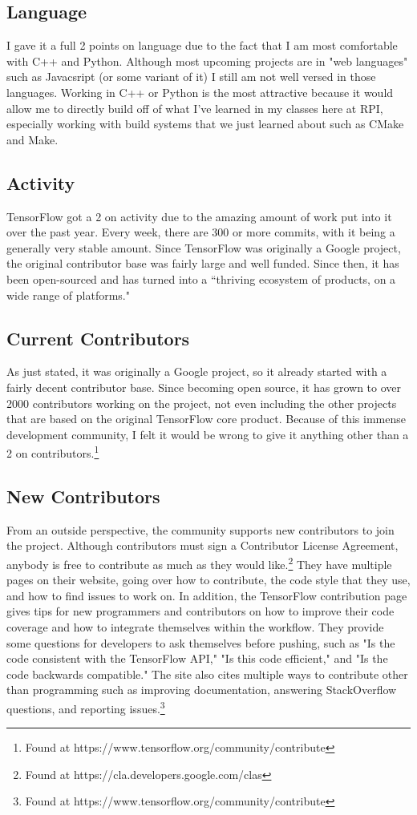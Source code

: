 \documentclass[12pt]{article}
\begin{document}
	\subsection{Language}
	I gave it a full 2 points on language due to the fact that I am most comfortable with C++ and Python. Although most upcoming projects are in "web languages" such as Javacsript (or some variant of it) I still am not well versed in those languages. Working in C++ or Python is the most attractive because it would allow me to directly build off of what I've learned in my classes here at RPI, especially working with build systems that we just learned about such as CMake and Make.
	
	\subsection{Activity}
	TensorFlow got a 2 on activity due to the amazing amount of work put into it over the past year. Every week, there are 300 or more commits, with it being a generally very stable amount. Since TensorFlow was originally a Google project, the original contributor base was fairly large and well funded. Since then, it has been open-sourced and has turned into a ``thriving ecosystem of products, on a wide range of platforms."
	
	\subsection{Current Contributors}
	As just stated, it was originally a Google project, so it already started with a fairly decent contributor base. Since becoming open source, it has grown to over 2000 contributors working on the project, not even including the other projects that are based on the original TensorFlow core product. Because of this immense development community, I felt it would be wrong to give it anything other than a 2 on contributors.\footnote{Found at https://www.tensorflow.org/community/contribute}
	
	\subsection{New Contributors}
	From an outside perspective, the community supports new contributors to join the project. Although contributors must sign a Contributor License Agreement, anybody is free to contribute as much as they would like.\footnote{Found at https://cla.developers.google.com/clas} They have multiple pages on their website, going over how to contribute, the code style that they use, and how to find issues to work on. In addition, the TensorFlow contribution page gives tips for new programmers and contributors on how to improve their code coverage and how to integrate themselves within the workflow. They provide some questions for developers to ask themselves before pushing, such as "Is the code consistent with the TensorFlow API," "Is this code efficient," and "Is the code backwards compatible." The site also cites multiple ways to contribute other than programming such as improving documentation, answering StackOverflow questions, and reporting issues.\footnote {Found at https://www.tensorflow.org/community/contribute}
	
\end{document}
